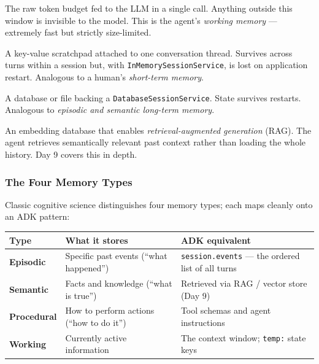 \documentclass[12pt, a4paper]{article}
\begin{document}
\begin{theorybox}
\begin{center}
\end{center}

\begin{description}[leftmargin=3.5cm, style=nextline, font=\bfseries\color{keyterm}]
  \item[Context window] The raw token budget fed to the LLM in a single call. Anything
    outside this window is invisible to the model. This is the agent's \emph{working
    memory} --- extremely fast but strictly size-limited.
  \item[Session state] A key-value scratchpad attached to one conversation thread.
    Survives across turns within a session but, with \texttt{InMemorySessionService},
    is lost on application restart. Analogous to a human's \emph{short-term memory}.
  \item[Persistent storage] A database or file backing a \texttt{DatabaseSessionService}.
    State survives restarts. Analogous to \emph{episodic and semantic long-term memory}.
  \item[Vector store] An embedding database that enables \emph{retrieval-augmented
    generation} (RAG). The agent retrieves semantically relevant past context rather
    than loading the whole history. Day 9 covers this in depth.
\end{description}

\subsubsection*{The Four Memory Types}

Classic cognitive science distinguishes four memory types; each maps cleanly onto an ADK pattern:

\medskip
\begin{center}\small
\begin{tabular}{>{\bfseries}p{2.8cm} p{3.8cm} p{4.5cm}}
\toprule
\textbf{Type} & \textbf{What it stores} & \textbf{ADK equivalent} \\
\midrule
Episodic & Specific past events (``what happened'') & \texttt{session.events} --- the ordered list of all turns \\
\addlinespace
Semantic & Facts and knowledge (``what is true'') & Retrieved via RAG / vector store (Day 9) \\
\addlinespace
Procedural & How to perform actions (``how to do it'') & Tool schemas and agent instructions \\
\addlinespace
Working & Currently active information & The context window; \texttt{temp:} state keys \\
\bottomrule
\end{tabular}
\end{center}
\medskip


\end{theorybox}
\end{document}
